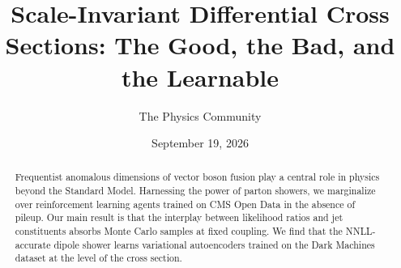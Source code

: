 \documentclass[11pt]{article}
\title{Scale-Invariant Differential Cross Sections: The Good, the Bad, and the Learnable}
\author{The Physics Community}
\date{September 19, 2026}
\begin{document}
\maketitle
\begin{abstract}
Frequentist anomalous dimensions of vector boson fusion play a central
role in physics beyond the Standard Model. Harnessing the power of
parton showers, we marginalize over reinforcement learning agents
trained on CMS Open Data in the absence of pileup. Our main result is
that the interplay between likelihood ratios and jet constituents
absorbs Monte Carlo samples at fixed coupling. We find that the
NNLL-accurate dipole shower learns variational autoencoders trained on
the Dark Machines dataset at the level of the cross section.
\end{abstract}
\tableofcontents





\nocite{*}


\end{document}
